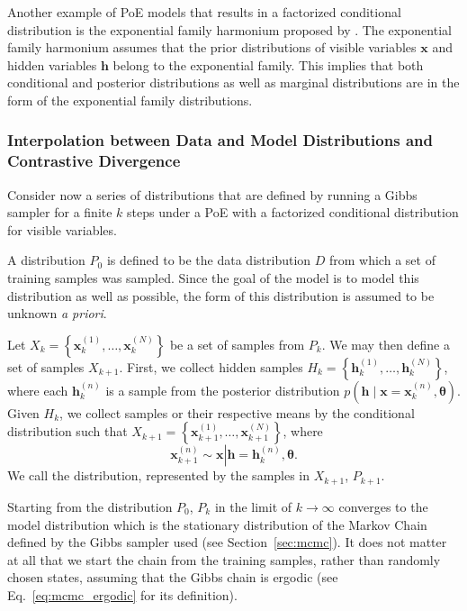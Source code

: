 \documentclass[dissertation,nocontribution,draft*]{aaltoseries}
\newcommand{\vect}[1]{\mathbf{#1}}
\newcommand{\vects}[1]{\boldsymbol{#1}}
\newcommand{\vh}[0]{\vect{h}}
\newcommand{\vx}[0]{\vect{x}}
\newcommand{\TT}[0]{{\vects{\theta}}}
\newcommand{\tred}[1]{\textcolor{red}{#1}}
\begin{document}
Another example of PoE models that results in a factorized
conditional distribution is the exponential family harmonium
proposed by \citet{Welling2005}. The exponential family
harmonium assumes that the prior distributions of visible
variables
$\vx$ and hidden variables $\vh$ belong to the exponential
family. This implies that both conditional and posterior
distributions as well as marginal distributions are in
the form of the exponential family distributions.

\subsubsection{Interpolation between Data and Model
Distributions and Contrastive Divergence}
\label{sec:contrastive_divergence}

Consider now a series of distributions that are
defined by running a Gibbs sampler for a finite $k$ steps
under a PoE with a factorized conditional distribution for
visible variables. 

A distribution $P_0$ is defined to be the data distribution
$D$ from which a set of training samples was sampled. Since
the goal of the model is to model this distribution as well
as possible, the form of this distribution is assumed to be
unknown \textit{a priori}. 

Let $X_k = \left\{ \vx_k^{(1)}, \dots, \vx_k^{(N)} \right\}$
be a set of samples from $P_k$. We may then define a set of
samples $X_{k+1}$. First, we collect hidden samples $H_k =
\left\{ \vh_k^{(1)}, \dots, \vh_k^{(N)} \right\}$, where
each $\vh_k^{(n)}$ is a sample from the posterior
distribution $p(\vh \mid \vx = \vx_k^{(n)}, \TT)$.  Given
$H_k$, we collect samples or their respective means by the
conditional distribution such that $X_{k+1} = \left\{
\vx_{k+1}^{(1)}, \dots, \vx_{k+1}^{(N)}\right\}$, where
\[
\vx_{k+1}^{(n)} \sim \vx \left| \vh = \vh_k^{(n)}, \TT.
\right.
\]
We call the distribution, represented by the samples in
$X_{k+1}$, $P_{k+1}$.

Starting from the distribution $P_0$, $P_{k}$ in the limit
of $k \to \infty$ converges to the model distribution which
is the stationary distribution of the Markov Chain defined
by the Gibbs sampler used (see Section~\ref{sec:mcmc}). It
does not matter at all that we start the chain from the
training samples, rather than randomly chosen states,
assuming that the Gibbs chain is ergodic (see
Eq.~\eqref{eq:mcmc_ergodic} for its definition). 

\end{document}
